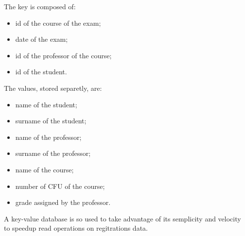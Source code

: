 \documentclass{report}
\begin{document}
The key is composed of:
\begin{itemize}
	\item id of the course of the exam;
	\item date of the exam;
	\item id of the professor of the course;
	\item id of the student.
\end{itemize}
The values, stored separetly, are:
\begin{itemize}
	\item name of the student;
	\item surname of the student;
	\item name of the professor;
	\item surname of the professor;
	\item name of the course;
	\item number of CFU of the course;
	\item grade assigned by the professor.
\end{itemize}

A key-value database is so used to take advantage of its semplicity and velocity to speedup read operations on regitrations data.

\end{document}
